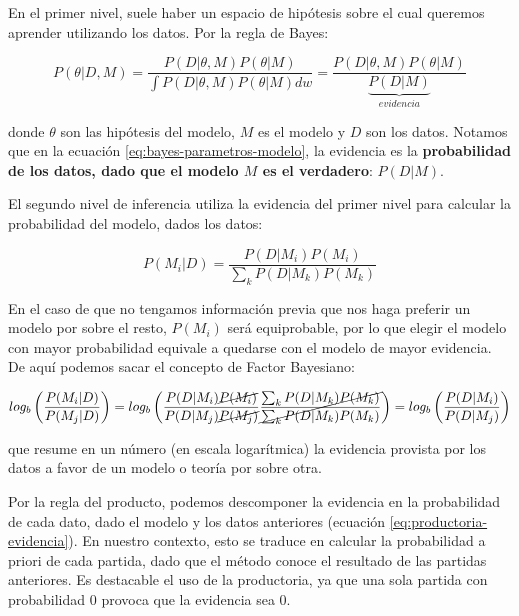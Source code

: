 \documentclass[a4paper,10pt]{report}
\begin{document}
En el primer nivel, suele haber un espacio de hip\'otesis sobre el cual queremos aprender utilizando los datos.
Por la regla de Bayes:

\begin{equation}\label{eq:bayes-parametros-modelo}
	P(\theta | D, M) = \frac{P(D|\theta, M) P(\theta|M)}{\int P(D|\theta, M) P(\theta|M) dw} = \frac{P(D|\theta, M) P(\theta|M)}{\underbrace{P(D|M)}_{evidencia}}
\end{equation}

donde $\theta$ son las hip\'otesis del modelo, $M$ es el modelo y $D$ son los datos.
Notamos que en la ecuación \ref{eq:bayes-parametros-modelo}, la evidencia es la \textbf{probabilidad de los datos, dado que el modelo $M$ es el verdadero}: $P(D|M)$.

El segundo nivel de inferencia utiliza la evidencia del primer nivel para calcular la probabilidad del modelo, dados los datos:

\begin{equation}\label{eq:bayes-modelos}
	P(M_i | D) = \frac{P(D|M_i) P(M_i)}{\sum_k P(D|M_k) P(M_k)}
\end{equation}

En el caso de que no tengamos informaci\'on previa que nos haga preferir un modelo por sobre el resto, $P(M_i)$ ser\'a equiprobable, por lo que elegir el modelo con mayor probabilidad equivale a quedarse con el modelo de mayor evidencia.
De aqu\'i podemos sacar el concepto de Factor Bayesiano\cite{kass1995-bayesFactors}:

\begin{equation}
	log_b\left(\frac{P(M_i|D)}{P(M_j|D)}\right) = log_b\left(\frac{P(D|M_i) \cancel{P(M_i)}}{P(D|M_j) \cancel{P(M_j)}} \cancel{\frac{\sum_k P(D|M_k) P(M_k)}{\sum_k P(D|M_k) P(M_k)}}\right) = log_b\left(\frac{P(D|M_i)}{P(D|M_j)}\right)
\end{equation}

que resume en un n\'umero (en escala logarítmica) la evidencia provista por los datos a favor de un modelo o teor\'ia por sobre otra.

Por la regla del producto, podemos descomponer la evidencia en la probabilidad de cada dato, dado el modelo y los datos anteriores (ecuación \ref{eq:productoria-evidencia}).
En nuestro contexto, esto se traduce en calcular la probabilidad a priori de cada partida, dado que el método conoce el resultado de las partidas anteriores.
Es destacable el uso de la productoria, ya que una sola partida con probabilidad 0 provoca que la evidencia sea 0.
\end{document}
